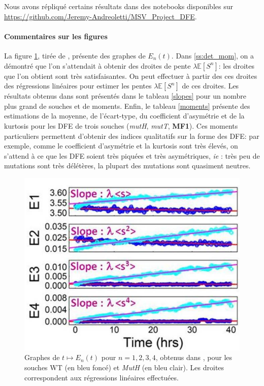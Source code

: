 \documentclass[12pt]{article}
\newcommand{\cro}[1]{\left[#1\right]}
\newcommand{\ie}{\emph{ie} }
\newcommand{\Esp}[1]{\mathbb{E}\cro{#1}}
\begin{document}
Nous avons répliqué certains résultats dans des notebooks disponibles sur \url{https://github.com/Jeremy-Andreoletti/MSV_Project_DFE}.
%

\paragraph{Commentaires sur les figures} La figure \ref{lines}, tirée de \cite{rob}, présente des graphes de $E_n(t)$. Dans \ref{ss:det_mom}, on a démontré que l'on s'attendait à obtenir des droites de pente $\lambda\Esp{S^n}$: les droites que l'on obtient sont très satisfaisantes. On peut effectuer à partir des ces droites des régressions linéaires pour estimer  les pentes $\lambda\Esp{S^n}$ de ces droites. Les résultats obtenus dans \cite{rob} sont présentés dans le tableau \ref{slopes} pour un nombre plus grand de souches et de moments. Enfin, le tableau \ref{moments} présente des estimations de la moyenne, de l'écart-type, du coefficient d'asymétrie et de la kurtosis pour les DFE de trois souches (\emph{mutH}, \emph{mutT}, \textbf{MF1}). Ces moments particuliers permettent d'obtenir des indices qualitatifs sur la forme des DFE: par exemple, comme le coefficient d'asymétrie et la kurtosis sont très élevés, on s'attend à ce que les DFE soient très piquées et très asymétriques, \ie: très peu de mutations sont très délétères, la plupart des mutations sont quasiment neutres.


\begin{figure}[h]
  \begin{center}
    \includegraphics[scale=0.3]{img/supmat_lines.png}
  \end{center}
  \caption{\label{lines}Graphes de $t\mapsto E_n(t)$ pour $n=1,2,3,4$, obtenus dans \cite{rob}, pour les souches WT (en bleu foncé) et \emph{MutH} (en bleu clair). Les droites correspondent aux régressions linéaires effectuées.}
\end{figure}
\end{document}
